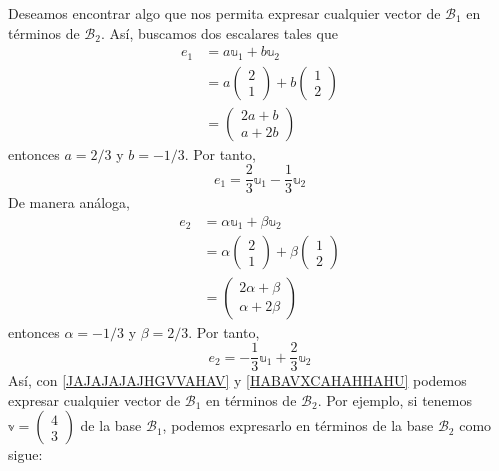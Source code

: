 Deseamos encontrar algo que nos permita expresar cualquier vector de $\mathcal{B}_1$ en términos de $\mathcal{B}_2$. Así, buscamos dos escalares tales que
\begin{align*}
    e_1 & = a \mathbb{u}_1 + b \mathbb{u}_2 \\
    & = a \begin{pmatrix}
        2 \\
        1
    \end{pmatrix} + b \begin{pmatrix}
        1 \\
        2
    \end{pmatrix} \\
    & = \begin{pmatrix}
        2a + b \\
        a + 2b
    \end{pmatrix}
\end{align*}
entonces $a = 2/3$ y $b = -1/3$. Por tanto,
\begin{equation}
    e_1 = \frac{2}{3} \mathbb{u}_1 - \frac{1}{3} \mathbb{u}_2 \label{JAJAJAJAJHGVVAHAV}
\end{equation}
De manera análoga,
\begin{align*}
    e_2 & = \alpha \mathbb{u}_1 + \beta \mathbb{u}_2 \\
    & = \alpha \begin{pmatrix}
        2 \\
        1
    \end{pmatrix} + \beta \begin{pmatrix}
        1 \\
        2
    \end{pmatrix} \\
    & = \begin{pmatrix}
        2\alpha + \beta \\
        \alpha + 2\beta
    \end{pmatrix}
\end{align*}
entonces $\alpha = -1/3$ y $\beta = 2/3$. Por tanto,
\begin{equation}
    e_2 = -\frac{1}{3} \mathbb{u}_1 + \frac{2}{3} \mathbb{u}_2 \label{HABAVXCAHAHHAHU}
\end{equation}
Así, con \eqref{JAJAJAJAJHGVVAHAV} y \eqref{HABAVXCAHAHHAHU} podemos expresar cualquier vector de $\mathcal{B}_1$ en términos de $\mathcal{B}_2$. Por ejemplo, si tenemos $\mathbb{v} = \begin{pmatrix}
    4 \\
    3
\end{pmatrix}$ de la base $\mathcal{B}_1$, podemos expresarlo en términos de la base $\mathcal{B}_2$ como sigue:
